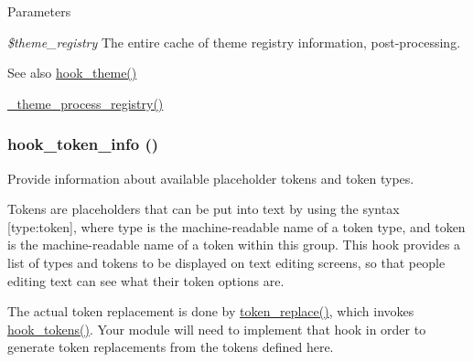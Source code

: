 \begin{DoxyParams}{Parameters}
\item[{\em \$theme\_\-registry}]The entire cache of theme registry information, post-\/processing.\end{DoxyParams}
\begin{DoxySeeAlso}{See also}
\hyperlink{group__hooks_ga013ccb45c7aaab1c16cf9691428c910d}{hook\_\-theme()} 

\hyperlink{includes_2theme_8inc_a473fae348447b091f0d8e677820d30c3}{\_\-theme\_\-process\_\-registry()} 
\end{DoxySeeAlso}
\hypertarget{group__hooks_gab868597197cf36911f95dcd29ae0b954}{
\subsubsection[{hook\_\-token\_\-info}]{\setlength{\rightskip}{0pt plus 5cm}hook\_\-token\_\-info ()}}
\label{group__hooks_gab868597197cf36911f95dcd29ae0b954}
Provide information about available placeholder tokens and token types.

Tokens are placeholders that can be put into text by using the syntax \mbox{[}type:token\mbox{]}, where type is the machine-\/readable name of a token type, and token is the machine-\/readable name of a token within this group. This hook provides a list of types and tokens to be displayed on text editing screens, so that people editing text can see what their token options are.

The actual token replacement is done by \hyperlink{includes_2token_8inc_a47eb294b05ca8d04439a9a82ccc4d82a}{token\_\-replace()}, which invokes \hyperlink{group__hooks_ga3bfd87d9a19b2397b0f970e1cff7ea4f}{hook\_\-tokens()}. Your module will need to implement that hook in order to generate token replacements from the tokens defined here.

